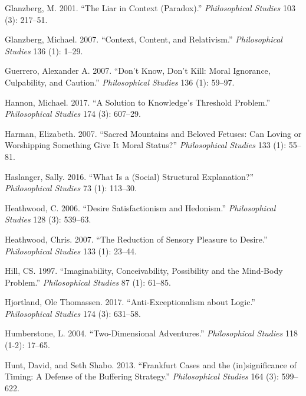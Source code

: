 \documentclass[
  10pt,
  letterpaper,
  DIV=11,
  numbers=noendperiod,
  twoside]{scrartcl}
\newlength{\cslhangindent}
\newenvironment{CSLReferences}[2] %
 {\begin{list}{}{%
  \setlength{\itemindent}{0pt}
  \setlength{\leftmargin}{0pt}
  \setlength{\parsep}{0pt}
  \ifodd #1
   \setlength{\leftmargin}{\cslhangindent}
   \setlength{\itemindent}{-1\cslhangindent}
  \fi
  \setlength{\itemsep}{#2\baselineskip}}}
 {\end{list}}
\begin{document}
\begin{CSLReferences}{1}{0}
Glanzberg, M. 2001. {``The Liar in Context (Paradox).''}
\emph{Philosophical Studies} 103 (3): 217--51.

Glanzberg, Michael. 2007. {``Context, Content, and Relativism.''}
\emph{Philosophical Studies} 136 (1): 1--29.

Guerrero, Alexander A. 2007. {``Don't Know, Don't Kill: Moral Ignorance,
Culpability, and Caution.''} \emph{Philosophical Studies} 136 (1):
59--97.

Hannon, Michael. 2017. {``A Solution to Knowledge's Threshold
Problem.''} \emph{Philosophical Studies} 174 (3): 607--29.

Harman, Elizabeth. 2007. {``Sacred Mountains and Beloved Fetuses: Can
Loving or Worshipping Something Give It Moral Status?''}
\emph{Philosophical Studies} 133 (1): 55--81.

Haslanger, Sally. 2016. {``What Is a (Social) Structural Explanation?''}
\emph{Philosophical Studies} 73 (1): 113--30.

Heathwood, C. 2006. {``Desire Satisfactionism and Hedonism.''}
\emph{Philosophical Studies} 128 (3): 539--63.

Heathwood, Chris. 2007. {``The Reduction of Sensory Pleasure to
Desire.''} \emph{Philosophical Studies} 133 (1): 23--44.

Hill, CS. 1997. {``Imaginability, Conceivability, Possibility and the
Mind-Body Problem.''} \emph{Philosophical Studies} 87 (1): 61--85.

Hjortland, Ole Thomassen. 2017. {``Anti-Exceptionalism about Logic.''}
\emph{Philosophical Studies} 174 (3): 631--58.

Humberstone, L. 2004. {``Two-Dimensional Adventures.''}
\emph{Philosophical Studies} 118 (1-2): 17--65.

Hunt, David, and Seth Shabo. 2013. {``Frankfurt Cases and the
(in)significance of Timing: A Defense of the Buffering Strategy.''}
\emph{Philosophical Studies} 164 (3): 599--622.


\end{CSLReferences}
\end{document}
